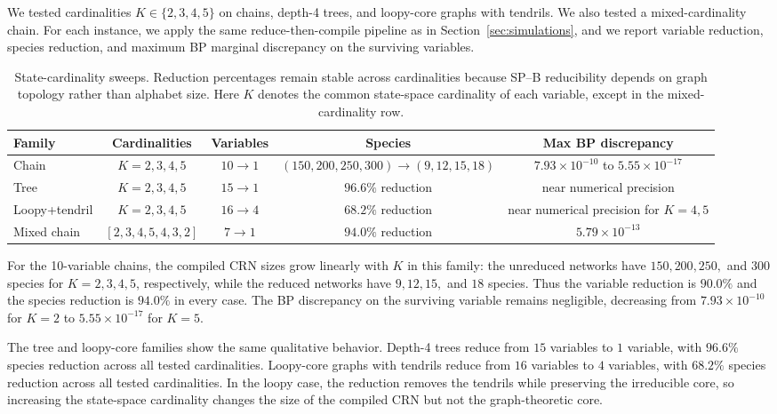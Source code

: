 \documentclass{article}
\theoremstyle{plain}
\theoremstyle{definition}
\theoremstyle{remark}
\newcommand{\<}{\langle}
\renewcommand{\>}{\rangle}
\begin{document}
We tested cardinalities $K \in \{2,3,4,5\}$ on chains, depth-4 trees, and
loopy-core graphs with tendrils. We also tested a mixed-cardinality chain.
For each instance, we apply the same reduce-then-compile pipeline as in
Section~\ref{sec:simulations}, and we report variable reduction, species
reduction, and maximum BP marginal discrepancy on the surviving variables.

\begin{table}[h]
\centering
\small
\caption{State-cardinality sweeps. Reduction percentages remain stable
across cardinalities because SP--B reducibility depends on graph topology
rather than alphabet size. Here $K$ denotes the common state-space
cardinality of each variable, except in the mixed-cardinality row.}
\label{tab:cardinality-sweeps}
\begin{tabular}{lcccc}
\toprule
\textbf{Family}
    & \textbf{Cardinalities}
    & \textbf{Variables}
    & \textbf{Species}
    & \textbf{Max BP discrepancy} \\
\midrule
Chain
    & $K=2,3,4,5$
    & $10 \to 1$
    & $(150,200,250,300) \to (9,12,15,18)$
    & $7.93{\times}10^{-10}$ to $5.55{\times}10^{-17}$ \\[3pt]

Tree
    & $K=2,3,4,5$
    & $15 \to 1$
    & $96.6\%$ reduction
    & near numerical precision \\[3pt]

Loopy+tendril
    & $K=2,3,4,5$
    & $16 \to 4$
    & $68.2\%$ reduction
    & near numerical precision for $K=4,5$ \\[3pt]

Mixed chain
    & $[2,3,4,5,4,3,2]$
    & $7 \to 1$
    & $94.0\%$ reduction
    & $5.79{\times}10^{-13}$ \\
\bottomrule
\end{tabular}
\end{table}

For the 10-variable chains, the compiled CRN sizes grow linearly with
$K$ in this family: the unreduced networks have
$150,200,250,$ and $300$ species for $K=2,3,4,5$, respectively, while the
reduced networks have $9,12,15,$ and $18$ species. Thus the variable
reduction is $90.0\%$ and the species reduction is $94.0\%$ in every case.
The BP discrepancy on the surviving variable remains negligible, decreasing
from $7.93 \times 10^{-10}$ for $K=2$ to $5.55 \times 10^{-17}$ for $K=5$.

The tree and loopy-core families show the same qualitative behavior.
Depth-4 trees reduce from $15$ variables to $1$ variable, with $96.6\%$
species reduction across all tested cardinalities. Loopy-core graphs with
tendrils reduce from $16$ variables to $4$ variables, with $68.2\%$ species
reduction across all tested cardinalities. In the loopy case, the reduction
removes the tendrils while preserving the irreducible core, so increasing
the state-space cardinality changes the size of the compiled CRN but not
the graph-theoretic core.
\end{document}
